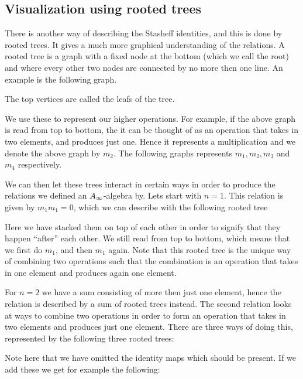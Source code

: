 
\subsection{Visualization using rooted trees}


There is another way of describing the Stasheff identities, and this is done by rooted trees. It gives a much more graphical understanding of the relations. A rooted tree is a graph with a fixed node at the bottom (which we call the root) and where every other two nodes are connected by no more then one line. An example is the following graph.



The top vertices are called the leafs of the tree. 

We use these to represent our higher operations. For example, if the above graph is read from top to bottom, the it can be thought of as an operation that takes in two elements, and produces just one. Hence it represents a multiplication and we denote the above graph by $m_2$. The following graphs represents $m_1, m_2, m_3$ and $m_4$ respectively. 




We can then let these trees interact in certain ways in order to produce the relations we defined an $A_{\infty}$-algebra by. Lets start with $n=1$. This relation is given by $m_1 m_1=0$, which we can describe with the following rooted tree


Here we have stacked them on top of each other in order to signify that they happen ``after'' each other. We still read from top to bottom, which means that we first do $m_1$, and then $m_1$ again. Note that this rooted tree is the unique way of combining two operations such that the combination is an operation that takes in one element and produces again one element. 

For $n=2$ we have a sum consisting of more then just one element, hence the relation is described by a sum of rooted trees instead. The second relation looks at ways to combine two operations in order to form an operation that takes in two elements and produces just one element. There are three ways of doing this, represented by the following three rooted trees:


Note here that we have omitted the identity maps which should be present. If we add these we get for example the following:


